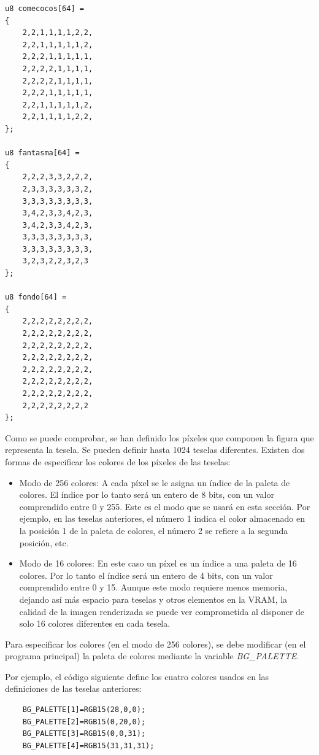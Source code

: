 \begin{lstlisting}
u8 comecocos[64] =
{
	2,2,1,1,1,1,2,2,
	2,2,1,1,1,1,1,2,
	2,2,2,1,1,1,1,1,
	2,2,2,2,1,1,1,1,
	2,2,2,2,1,1,1,1,
	2,2,2,1,1,1,1,1,
	2,2,1,1,1,1,1,2,
	2,2,1,1,1,1,2,2,
};

u8 fantasma[64] =
{
	2,2,2,3,3,2,2,2,
	2,3,3,3,3,3,3,2,
	3,3,3,3,3,3,3,3,
	3,4,2,3,3,4,2,3,
	3,4,2,3,3,4,2,3,
	3,3,3,3,3,3,3,3,
	3,3,3,3,3,3,3,3,
	3,2,3,2,2,3,2,3
};

u8 fondo[64] =
{
	2,2,2,2,2,2,2,2,
	2,2,2,2,2,2,2,2,
	2,2,2,2,2,2,2,2,
	2,2,2,2,2,2,2,2,
	2,2,2,2,2,2,2,2,
	2,2,2,2,2,2,2,2,
	2,2,2,2,2,2,2,2,
	2,2,2,2,2,2,2,2
};
\end{lstlisting}

Como se puede comprobar, se han definido los píxeles que componen la figura que representa la tesela. Se pueden definir hasta 1024 teselas diferentes. Existen dos formas de especificar los colores de los píxeles de las teselas:

\begin{itemize}
\item Modo de 256 colores: A cada píxel se le asigna un índice de la paleta de colores. El índice por lo tanto será un entero de 8 bits, con un valor comprendido entre 0 y 255. Este es el modo que se usará en esta sección. Por ejemplo, en las teselas anteriores, el número 1 indica el color almacenado en la posición 1 de la paleta de colores, el número 2 se refiere a la segunda posición, etc. 
%
\item Modo de 16 colores: En este caso un píxel es un índice a una paleta de 16 colores. Por lo tanto el índice será un entero de 4 bits, con un valor comprendido entre 0 y 15. Aunque este modo requiere menos memoria, dejando así más espacio para teselas y otros elementos en la VRAM, la calidad de la imagen renderizada se puede ver comprometida al disponer de solo 16 colores diferentes en cada tesela.
\end{itemize}

Para especificar los colores (en el modo de 256 colores), se debe modificar (en el programa principal) la paleta de colores mediante la variable \textit{BG\_PALETTE}. 

Por ejemplo, el código siguiente define los cuatro colores usados en las definiciones de las teselas anteriores:

\begin{lstlisting}
	BG_PALETTE[1]=RGB15(28,0,0);
	BG_PALETTE[2]=RGB15(0,20,0);
	BG_PALETTE[3]=RGB15(0,0,31);
	BG_PALETTE[4]=RGB15(31,31,31);
\end{lstlisting}
	
